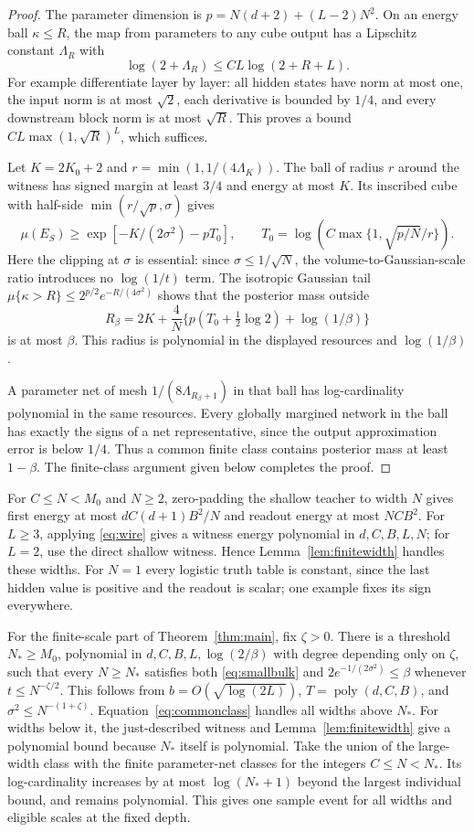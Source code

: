 \documentclass[11pt]{article}
\theoremstyle{remark}\newtheorem{remark}[theorem]{Remark}
\newcommand{\poly}{\operatorname{poly}}
\begin{document}
\begin{proof}
The parameter dimension is $p=N(d+2)+(L-2)N^2$. On an energy ball
$\kappa\le R$, the map from parameters to any cube output has a
Lipschitz constant $\Lambda_R$ with
\[
 \log(2+\Lambda_R)\le CL\log(2+R+L).
\]
For example differentiate layer by layer: all hidden states have norm
at most one, the input norm is at most $\sqrt2$, each derivative is
bounded by $1/4$, and every downstream block norm is at most $\sqrt R$.
This proves a bound $C L\max(1,\sqrt R)^L$, which suffices.

Let $K=2K_0+2$ and $r=\min(1,1/(4\Lambda_K))$. The ball of radius $r$
around the witness has signed margin at least $3/4$ and energy at most
$K$. Its inscribed cube with half-side $\min(r/\sqrt p,\sigma)$ gives
\[
 \mu(E_S)\ge\exp[-K/(2\sigma^2)-pT_0],\qquad
 T_0=\log\!\left(C\max\{1,\sqrt{p/N}/r\}\right).
\]
Here the clipping at $\sigma$ is essential: since $\sigma\le1/\sqrt N$,
the volume-to-Gaussian-scale ratio introduces no $\log(1/t)$ term.
The isotropic Gaussian tail
$\mu\{\kappa>R\}\le2^{p/2}e^{-R/(4\sigma^2)}$ shows that the posterior
mass outside
\[
 R_\beta=2K+\frac4N\{p(T_0+\tfrac12\log2)+\log(1/\beta)\}
\]
is at most $\beta$. This radius is polynomial in the displayed resources
and $\log(1/\beta)$.

A parameter net of mesh $1/(8\Lambda_{R_\beta+1})$ in that ball has
log-cardinality polynomial in the same resources. Every globally margined
network in the ball has exactly the signs of a net representative, since
the output approximation error is below $1/4$. Thus a common finite
class contains posterior mass at least $1-\beta$. The finite-class
argument given below completes the proof.
\end{proof}

For $C\le N<M_0$ and $N\ge2$, zero-padding the shallow teacher to width
$N$ gives first energy at most $dC(d+1)B^2/N$ and readout energy at most
$NCB^2$. For $L\ge3$, applying \eqref{eq:wire} gives a witness energy
polynomial in $d,C,B,L,N$; for $L=2$, use the direct shallow witness.
Hence Lemma~\ref{lem:finitewidth}
handles these widths. For $N=1$ every logistic truth table is constant,
since the last hidden value is positive and the readout is scalar;
one example fixes its sign everywhere.

For the finite-scale part of Theorem~\ref{thm:main}, fix $\zeta>0$.
There is a threshold $N_*\ge M_0$, polynomial in
$d,C,B,L,\log(2/\beta)$ with degree depending only on $\zeta$, such that
every $N\ge N_*$ satisfies both \eqref{eq:smallbulk} and
$2e^{-1/(2\sigma^2)}\le\beta$ whenever $t\le N^{-\zeta/2}$.
This follows from $b=O(\sqrt{\log(2L)})$, $T=\poly(d,C,B)$, and
$\sigma^2\le N^{-(1+\zeta)}$. Equation~\eqref{eq:commonclass} handles
all widths above $N_*$. For widths below it, the just-described witness
and Lemma~\ref{lem:finitewidth} give a polynomial bound because $N_*$
itself is polynomial. Take the union of the large-width class with the
finite parameter-net classes for the integers $C\le N<N_*$. Its
log-cardinality increases by at most $\log(N_*+1)$ beyond the largest
individual bound, and remains polynomial. This gives one sample event
for all widths and eligible scales at the fixed depth.
\end{document}
